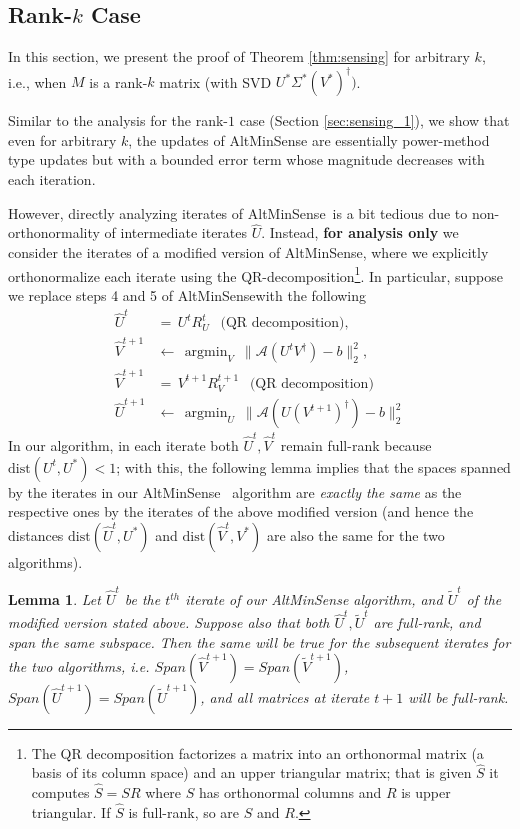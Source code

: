 \documentclass[11pt]{article}
\theoremstyle{plain}
\newtheorem{lemma}[theorem]{Lemma}
\theoremstyle{definition}
\newcommand{\dist}{\mathrm{dist}}
\DeclareMathOperator*{\argmin}{argmin}
\newcommand{\aff}{{\mathcal A}}
\newcommand{\as}{AltMinSense\ }
\newcommand{\ase}{AltMinSense}
\begin{document}
\subsection{Rank-$k$ Case}
\label{sec:sensing_k}
In this section, we present the proof of Theorem \ref{thm:sensing} for arbitrary $k$, i.e., when $M$ is a rank-$k$ matrix (with SVD $U^*\Sigma^* \left(V^*\right)^{\dag})$.

Similar to the analysis for the rank-$1$ case (Section \ref{sec:sensing_1}), we show that even for arbitrary $k$, the updates of AltMinSense are essentially power-method type updates but with a bounded error term whose magnitude decreases with each iteration.

However, directly analyzing iterates of \as is a bit tedious due to non-orthonormality of intermediate iterates $\widehat{U}$. Instead, {\bf for analysis only} we consider the iterates of a modified version of \ase, where we explicitly orthonormalize each iterate using the QR-decomposition\footnote{The QR decomposition factorizes a matrix into an orthonormal matrix (a basis of its column space) and an upper triangular matrix; that is given $\widehat{S}$ it computes $\widehat{S} = SR$ where $S$ has orthonormal columns and $R$ is upper triangular. If $\widehat{S}$ is full-rank, so are $S$ and $R$.}. In particular, suppose we replace steps 4 and 5 of \ase with the following 
\begin{align}
\widehat{U}^{t}&= \, U^{t}R_U^{t}\ \ \text{ (QR decomposition), }\nonumber\\
\widehat{V}^{t+1}&\leftarrow \, \argmin_{V} \  \|\aff(U^t V^\dag )-b\|_2^2,\nonumber\\ 
\widehat{V}^{t+1}&= \, V^{t+1}R_V^{t+1}\ \ \text{ (QR decomposition) } \nonumber  \\
\widehat{U}^{t+1}&\leftarrow \, \argmin_{U} \  \|\aff(U (V^{t+1})^\dag )-b\|_2^2 \label{eq:update_k1}
\end{align}
In our algorithm, in each iterate both $\widehat{U}^{t},\widehat{V}^{t}$ remain full-rank because $\dist\left(U^t,U^*\right)<1$; with this, the following lemma implies that the spaces spanned by the iterates in our \ase ~ algorithm are {\em exactly the same} as the respective ones by the iterates of the above modified version (and hence the distances $\dist(\widehat{U}^{t},U^*)$ and $\dist(\widehat{V}^{t},V^*)$ are also the same for the two algorithms).

\begin{lemma}\label{lemma:QR-irrelevance}
Let $\widehat{U}^t$ be the $t^{th}$ iterate of our AltMinSense algorithm, and $\widetilde{U}^t$ of the modified version stated above. Suppose also that both $\widehat{U}^t,\widetilde{U}^t$ are full-rank, and span the same subspace. Then the same will be true for the subsequent iterates for the two algorithms, i.e. $Span(\widehat{V}^{t+1}) = Span(\widetilde{V}^{t+1})$, $Span(\widehat{U}^{t+1}) = Span(\widetilde{U}^{t+1})$, and all matrices at iterate $t+1$ will be full-rank.
\end{lemma}
\end{document}
